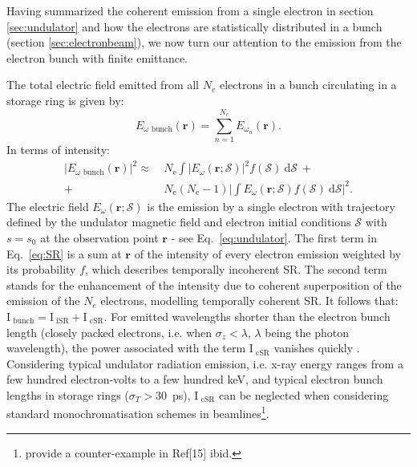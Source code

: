 \documentclass{iucr}              %
\begin{document}
Having summarized the coherent emission from a single electron in section \ref{sec:undulator} and how the electrons are statistically distributed in a bunch (section \ref{sec:electronbeam}), we now turn our attention to the emission from the electron bunch with finite emittance. %

The total electric field emitted from all $N_e$ electrons in a bunch circulating in a storage ring is given by: 
\begin{equation}
    E_{\omega \text{~bunch}}(\textbf{r}) = \sum_{n=1}^{N_e} E_{\omega_{n}}(\textbf{r}).
\end{equation}
In terms of intensity: 
\begin{equation}
\begin{split}
|E_{\omega\text{~bunch}}(\textbf{r})|^2 \approx ~&N_\text{e} \int\big| E_\omega(\textbf{r};\mathcal{S})\big|^2 f(\mathcal{S})~ \text{d}\mathcal{S}~+\\
+~ &N_\text{e}(N_\text{e}-1)\bigg| \int E_\omega(\textbf{r};\mathcal{S}) f(\mathcal{S})~ \text{d}\mathcal{S} \bigg|^2.
\end{split}
\label{eq:SR}
\end{equation}
The electric field $E_\omega(\textbf{r};\mathcal{S})$ is the emission by a single electron with trajectory defined by the undulator magnetic field and electron initial conditions $\mathcal{S}$ with $s=s_0$ at the observation point $\textbf{r}$ - see Eq.~\ref{eq:undulator}. The first term in Eq.~\ref{eq:SR} is a sum at $\textbf{r}$ of the intensity of every electron emission weighted by its probability $f$, which describes temporally incoherent SR. The second term stands for the enhancement of the intensity due to coherent superposition of the emission of the $N_e$ electrons, modelling temporally coherent SR. It follows that: $\text{I}_\text{~bunch} = \text{I}_\text{~iSR}+\text{I}_\text{~cSR}$. For emitted wavelengths shorter than the electron bunch length (closely packed electrons, i.e. when $\sigma_z < \lambda$, $\lambda$ being the photon wavelength), the power associated with the term $\text{I}_\text{~cSR}$ vanishes quickly \cite{CSR,Wiedemann2015}. Considering typical undulator radiation emission, i.e. x-ray energy ranges from a few hundred electron-volts to a few hundred keV, and typical electron bunch lengths in storage rings ($\sigma_{T}>30$~ps), $\text{I}_\text{~cSR}$ can be neglected when considering standard monochromatisation schemes in beamlines\footnote{ provide a counter-example in Ref[15] ibid.}.
\end{document}
